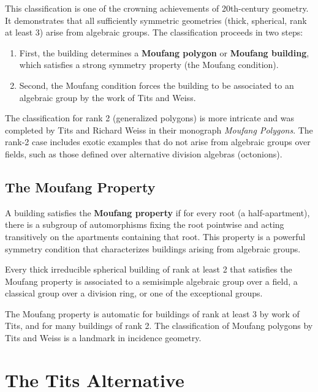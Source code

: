 This classification is one of the crowning achievements of 20th-century geometry. It demonstrates that all sufficiently symmetric geometries (thick, spherical, rank at least 3) arise from algebraic groups. The classification proceeds in two steps:
\begin{enumerate}
    \item First, the building determines a \textbf{Moufang polygon} or \textbf{Moufang building}, which satisfies a strong symmetry property (the Moufang condition).
    \item Second, the Moufang condition forces the building to be associated to an algebraic group by the work of Tits and Weiss.
\end{enumerate}

The classification for rank 2 (generalized polygons) is more intricate and was completed by Tits and Richard Weiss in their monograph \textit{Moufang Polygons}. The rank-2 case includes exotic examples that do not arise from algebraic groups over fields, such as those defined over alternative division algebras (octonions).

\subsection{The Moufang Property}

A building satisfies the \textbf{Moufang property} if for every root (a half-apartment), there is a subgroup of automorphisms fixing the root pointwise and acting transitively on the apartments containing that root. This property is a powerful symmetry condition that characterizes buildings arising from algebraic groups.

\begin{theorem}[Tits, 1974]
Every thick irreducible spherical building of rank at least 2 that satisfies the Moufang property is associated to a semisimple algebraic group over a field, a classical group over a division ring, or one of the exceptional groups.
\end{theorem}

The Moufang property is automatic for buildings of rank at least 3 by work of Tits, and for many buildings of rank 2. The classification of Moufang polygons by Tits and Weiss is a landmark in incidence geometry.

\section{The Tits Alternative}

